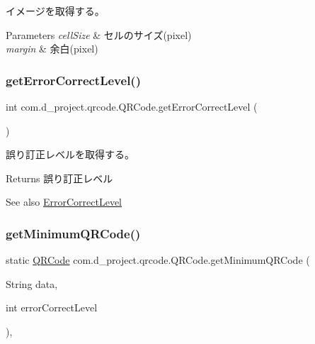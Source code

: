 イメージを取得する。 
\begin{DoxyParams}{Parameters}
{\em cell\+Size} & セルのサイズ(pixel) \\
\hline
{\em margin} & 余白(pixel) \\
\hline
\end{DoxyParams}
\mbox{\label{classcom_1_1d__project_1_1qrcode_1_1_q_r_code_a9b1f2ec05c5c1aea9511eb59e667e142}} 
\subsubsection{\texorpdfstring{get\+Error\+Correct\+Level()}{getErrorCorrectLevel()}}
{\footnotesize\ttfamily int com.\+d\+\_\+project.\+qrcode.\+Q\+R\+Code.\+get\+Error\+Correct\+Level (\begin{DoxyParamCaption}{ }\end{DoxyParamCaption})\hspace{0.3cm}{\ttfamily [inline]}}

誤り訂正レベルを取得する。 \begin{DoxyReturn}{Returns}
誤り訂正レベル 
\end{DoxyReturn}
\begin{DoxySeeAlso}{See also}
\hyperlink{interfacecom_1_1d__project_1_1qrcode_1_1_error_correct_level}{Error\+Correct\+Level} 
\end{DoxySeeAlso}
\mbox{\label{classcom_1_1d__project_1_1qrcode_1_1_q_r_code_a3130b29d5ceadb1fa74064c0e34bfc6a}} 
\subsubsection{\texorpdfstring{get\+Minimum\+Q\+R\+Code()}{getMinimumQRCode()}}
{\footnotesize\ttfamily static \hyperlink{classcom_1_1d__project_1_1qrcode_1_1_q_r_code}{Q\+R\+Code} com.\+d\+\_\+project.\+qrcode.\+Q\+R\+Code.\+get\+Minimum\+Q\+R\+Code (\begin{DoxyParamCaption}\item[{String}]{data,  }\item[{int}]{error\+Correct\+Level }\end{DoxyParamCaption})\hspace{0.3cm}{\ttfamily [inline]}, {\ttfamily [static]}}

